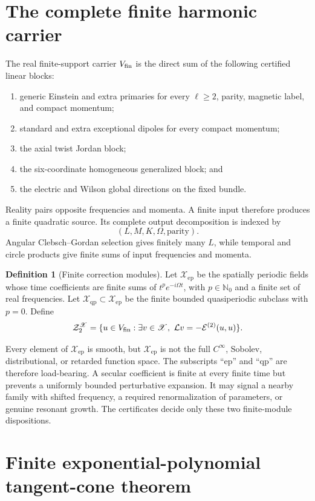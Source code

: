 \documentclass[11pt]{article}
\theoremstyle{definition}
\newtheorem{definition}[theorem]{Definition}
\theoremstyle{remark}
\newcommand{\cE}{\mathcal E}
\newcommand{\cL}{\mathcal L}
\newcommand{\cZ}{\mathcal Z}
\newcommand{\Xep}{\mathscr X_{\mathrm{ep}}}
\newcommand{\Xqp}{\mathscr X_{\mathrm{qp}}}
\begin{document}
\section{The complete finite harmonic carrier}

The real finite-support carrier \(V_{\rm fin}\) is the direct sum of the
following certified linear blocks:
\begin{enumerate}
\item generic Einstein and extra primaries for every \(\ell\ge2\), parity,
      magnetic label, and compact momentum;
\item standard and extra exceptional dipoles for every compact momentum;
\item the axial twist Jordan block;
\item the six-coordinate homogeneous generalized block; and
\item the electric and Wilson global directions on the fixed bundle.
\end{enumerate}
Reality pairs opposite frequencies and momenta.  A finite input therefore
produces a finite quadratic source.  Its complete output decomposition is
indexed by
\[
 (L,M,K,\Omega,\text{parity}).
\]
Angular Clebsch--Gordan selection gives finitely many \(L\), while temporal
and circle products give finite sums of input frequencies and momenta.

\begin{definition}[Finite correction modules]
Let \(\Xep\) be the spatially periodic fields whose time coefficients are
finite sums of \(t^p e^{-i\Omega t}\), with \(p\in\mathbb N_0\) and a finite
set of real frequencies.  Let \(\Xqp\subset\Xep\) be the finite bounded
quasiperiodic subclass with \(p=0\).  Define
\[
 \cZ_2^{\mathscr X}
 =\{u\in V_{\rm fin}:\exists v\in\mathscr X,
             \ \cL v=-\cE^{(2)}(u,u)\}.
\]
\end{definition}

Every element of \(\Xep\) is smooth, but \(\Xep\) is not the full
\(C^\infty\), Sobolev, distributional, or retarded function space.  The
subscripts ``ep'' and ``qp'' are therefore load-bearing.  A secular
coefficient is finite at every finite time but prevents a uniformly bounded
perturbative expansion.  It may signal a nearby family with shifted
frequency, a required renormalization of parameters, or genuine resonant
growth.  The certificates decide only these two finite-module dispositions.

\section{Finite exponential-polynomial tangent-cone theorem}
\end{document}
